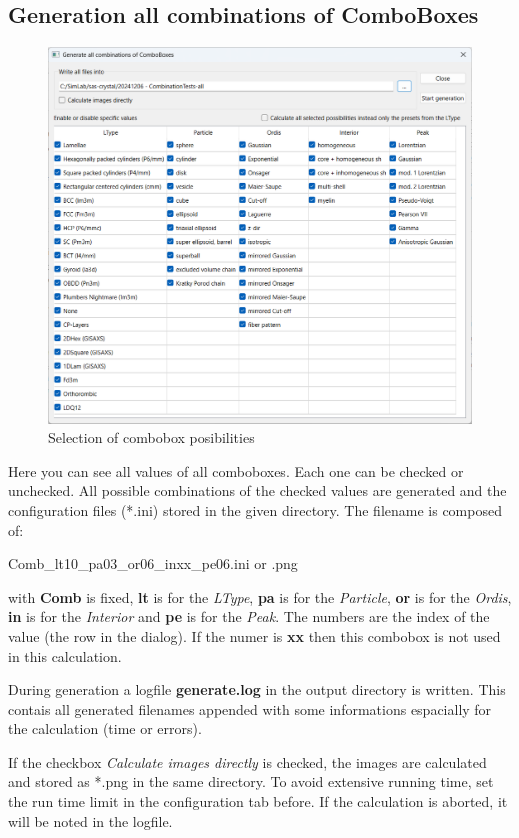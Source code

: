 \documentclass[11pt]{article} %
\begin{document}
\subsection{Generation all combinations of ComboBoxes}

\begin{figure}[H]
 \centering
 \includegraphics[width=\textwidth]{combinationsCBS.png}
 \caption{Selection of combobox posibilities}
\end{figure}
Here you can see all values of all comboboxes. Each one can be checked or unchecked. All possible combinations of the checked values are generated and the configuration files (*.ini) stored in the given directory. The filename is composed of: \\
\centerline{Comb\_lt10\_pa03\_or06\_inxx\_pe06.ini  or  .png}
with {\bf Comb} is fixed, {\bf lt} is for the {\it LType}, {\bf pa} is for the {\it Particle}, {\bf or} is for the {\it Ordis}, {\bf in} is for the {\it Interior} and {\bf pe} is for the {\it Peak}. The numbers are the index of the value (the row in the dialog). If the numer is {\bf xx} then this combobox is not used in this calculation.

During generation a logfile {\bf generate.log} in the output directory is written. This contais all generated filenames appended with some informations espacially for the calculation (time or errors).

If the checkbox {\it Calculate images directly} is checked, the images are calculated and stored as *.png in the same directory. To avoid extensive running time, set the run time limit in the configuration tab before. If the calculation is aborted, it will be noted in the logfile.
\end{document}
